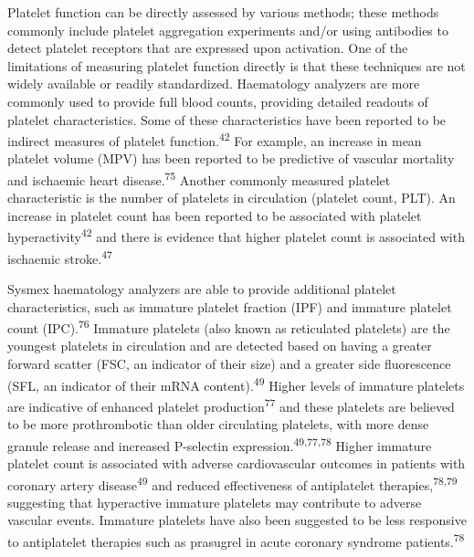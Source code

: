 \documentclass[11pt,twoside]{bristolthesis}
\begin{document}
Platelet function can be directly assessed by various methods; these methods commonly include platelet aggregation experiments and/or using antibodies to detect platelet receptors that are expressed upon activation. One of the limitations of measuring platelet function directly is that these techniques are not widely available or readily standardized. Haematology analyzers are more commonly used to provide full blood counts, providing detailed readouts of platelet characteristics. Some of these characteristics have been reported to be indirect measures of platelet function.\textsuperscript{42} For example, an increase in mean platelet volume (MPV) has been reported to be predictive of vascular mortality and ischaemic heart disease.\textsuperscript{75} Another commonly measured platelet characteristic is the number of platelets in circulation (platelet count, PLT). An increase in platelet count has been reported to be associated with platelet hyperactivity\textsuperscript{42} and there is evidence that higher platelet count is associated with ischaemic stroke.\textsuperscript{47}

Sysmex haematology analyzers are able to provide additional platelet characteristics, such as immature platelet fraction (IPF) and immature platelet count (IPC).\textsuperscript{76} Immature platelets (also known as reticulated platelets) are the youngest platelets in circulation and are detected based on having a greater forward scatter (FSC, an indicator of their size) and a greater side fluorescence (SFL, an indicator of their mRNA content).\textsuperscript{49} Higher levels of immature platelets are indicative of enhanced platelet production\textsuperscript{77} and these platelets are believed to be more prothrombotic than older circulating platelets, with more dense granule release and increased P-selectin expression.\textsuperscript{49,77,78} Higher immature platelet count is associated with adverse cardiovascular outcomes in patients with coronary artery disease\textsuperscript{49} and reduced effectiveness of antiplatelet therapies,\textsuperscript{78,79} suggesting that hyperactive immature platelets may contribute to adverse vascular events. Immature platelets have also been suggested to be less responsive to antiplatelet therapies such as prasugrel in acute coronary syndrome patients.\textsuperscript{78}
\end{document}
